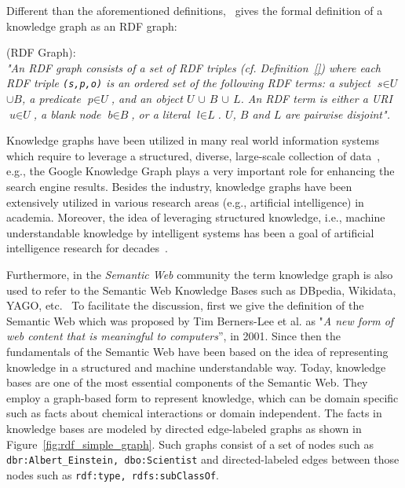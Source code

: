 \noindent Different than the aforementioned definitions,~\textcite{DBLP:journals/semweb/FarberBMR18} gives the formal definition of a knowledge graph as an RDF graph:

\theoremstyle{definition}
\begin{definition}{(RDF Graph):\\}
\textit{"An RDF graph consists of a set of RDF triples (cf. Definition~\ref{}) where each RDF triple \texttt{(s,p,o)} is an ordered set of the following
RDF terms: a subject \texttt{$\textit{s}\in\textit{U}$} $\cup$\texttt{$\textit{B}$}, a predicate \texttt{$\textit{p}\in\textit{U}$}, and an object \texttt{$\textit{U}$} $\cup$  \texttt{$\textit{B}$} $\cup$ \texttt{$\textit{L}$}. An RDF term is either a URI \texttt{$\textit{u}\in\textit{U}$}, a blank node \texttt{$\textit{b}\in\textit{B}$}, or a literal \texttt{$\textit{l}\in\textit{L}$}. \texttt{$\textit{U}$},  \texttt{$\textit{B}$} and \texttt{$\textit{L}$} are pairwise disjoint".}~\cite{DBLP:journals/semweb/FarberBMR18}
\end{definition} 
\theoremstyle{definition}
Knowledge graphs have been utilized in many real world information systems which require to leverage a structured, diverse, large-scale collection of data~\cite{DBLP:journals/semweb/Paulheim17,hogan2020knowledge}, e.g., the Google Knowledge Graph plays a very important role for enhancing the search engine results.  Besides the industry, knowledge graphs have been extensively utilized in various research areas (e.g., artificial intelligence) in academia. Moreover, the idea of leveraging structured knowledge, i.e., machine understandable knowledge by intelligent systems has been a goal of artificial intelligence research for decades~\cite{DBLP:journals/semweb/Paulheim17}. %

Furthermore, in the \textit{Semantic Web} community the term knowledge graph is also used to refer to the Semantic Web Knowledge Bases such as DBpedia, Wikidata, YAGO, etc.~\cite{DBLP:journals/semweb/Paulheim17} To facilitate the discussion, first we give the definition of the Semantic Web which was proposed by Tim Berners-Lee et al. as "\textit{A new form of web content that is meaningful to computers}'', in 2001. Since then the fundamentals of the Semantic Web have been based on the idea of representing knowledge in a structured and machine understandable way. Today, knowledge bases are one of the most essential components of the Semantic Web.
They employ a graph-based form to represent knowledge, which can be domain specific such as facts about chemical interactions or domain independent. The facts in knowledge bases are modeled by directed edge-labeled graphs as shown in Figure~\ref{fig:rdf_simple_graph}. Such graphs consist of a set of nodes such as \texttt{dbr:Albert\_Einstein, dbo:Scientist} and directed-labeled edges between those nodes such as \texttt{rdf:type, rdfs:subClassOf}. 
\\\\


